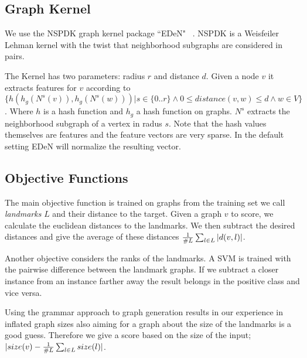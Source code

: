 \documentclass{esannV2}
\begin{document}

\subsection{Graph Kernel}
We use the NSPDK graph kernel package ``EDeN" ~\cite{costa2010fast}. NSPDK is a Weisfeiler Lehman \cite{weisfeiler}
kernel with the twist that neighborhood subgraphs are considered in pairs.

The Kernel has two parameters: radius $r$ and distance $d$. Given a node $v$ it extracts features for $v$ according to 
$\{ h(h_g(N^s(v)),h_g(N^s(w))) | s \in \{0..r\} \wedge 0 \leq
distance(v,w) \leq d  \wedge w\in V \}$.  Where $h$ is a hash function and 
$h_g$ a hash function on graphs. $N^s$ extracts the neighborhood subgraph of a
vertex in radus $s$. Note that the hash values themselves are features and the feature
vectors are very sparse. In the default setting EDeN will normalize the resulting vector.

\subsection{Objective Functions}

The main objective function is trained on graphs from the training set we call 
\emph{landmarks} $L$ and their distance to the target. 
Given a graph $v$ to score, we calculate the euclidean distances to the landmarks. We then subtract 
the desired distances and give the average of these distances 
$ {1 \over{\#L} }\sum_{l \in L} |d(v,l)|$.

Another objective considers the ranks of the landmarks. A SVM is trained 
with the pairwise difference between the landmark graphs. If we subtract a closer instance
from an instance farther away the result belongs in the positive class and vice versa.


Using the grammar approach to graph generation results in our experience in 
inflated graph sizes also aiming for a graph about the size of the landmarks is a good guess.
Therefore we give a score based on the size of the input; $|size(v) - {1\over{\#L}} \sum_{l \in L} size(l)|$.
\end{document}
